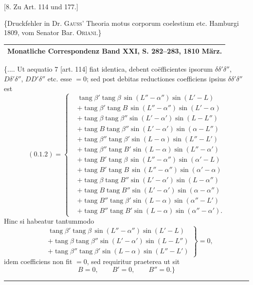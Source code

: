 \begin{center}
[8. Zu Art. 114 und 177.]
\end{center}
\begin{center}
\{Druckfehler in Dr. \textsc{Gauss}' Theoria motus corporum coelestium etc. Hamburgi 1809, vom Senator Bar. \textsc{Oriani}.\}
\end{center}
\begin{center}
\begin{tabular}{c}\hline
\small Monatliche Correspondenz Band XXI, S. 282--283, 1810 März.\\\hline
\end{tabular}
\end{center}
\{.... Ut aequatio 7 [art. 114] fiat identica, debent coëfficientes ipsorum \(\delta\delta'\delta''\), \(D\delta'\delta''\), \(DD'\delta''\) etc. esse \(=0\); sed post debitas reductiones coefficiens ipsius \(\delta\delta'\delta''\) est
\[
(0.1.2)=\left\{\begin{aligned}
&\operatorname{tang}\beta'\operatorname{tang}\beta\,\sin(L''-\alpha'')\sin(L'-L)\\
&+\operatorname{tang}\beta'\operatorname{tang}B\,\sin(L''-\alpha'')\sin(L'-\alpha)\\
&+\operatorname{tang}\beta\operatorname{tang}\beta''\sin(L'-\alpha')\sin(L-L'')\\
&+\operatorname{tang}B\operatorname{tang}\beta''\sin(L'-\alpha')\sin(\alpha-L'')\\
&+\operatorname{tang}\beta''\operatorname{tang}\beta'\sin(L-\alpha)\sin(L''-L')\\
&+\operatorname{tang}\beta''\operatorname{tang}B'\sin(L-\alpha)\sin(L''-\alpha')\\
&+\operatorname{tang}B'\operatorname{tang}\beta\,\sin(L''-\alpha'')\sin(\alpha'-L)\\
&+\operatorname{tang}B'\operatorname{tang}B\,\sin(L''-\alpha'')\sin(\alpha'-\alpha)\\
&+\operatorname{tang}\beta\operatorname{tang}B''\sin(L'-\alpha')\sin(L-\alpha'')\\
&+\operatorname{tang}B\operatorname{tang}B''\sin(L'-\alpha')\sin(\alpha-\alpha'')\\
&+\operatorname{tang}B''\operatorname{tang}\beta'\sin(L-\alpha)\sin(\alpha''-L')\\
&+\operatorname{tang}B''\operatorname{tang}B'\sin(L-\alpha)\sin(\alpha''-\alpha').
\end{aligned}\right.
\]
Hinc si habeatur tantummodo
\[
\left.\begin{aligned}
&\operatorname{tang}\beta'\operatorname{tang}\beta\,\sin(L''-\alpha'')\sin(L'-L)\\
&+\operatorname{tang}\beta\operatorname{tang}\beta''\sin(L'-\alpha')\sin(L-L'')\\
&+\operatorname{tang}\beta''\operatorname{tang}\beta'\sin(L-\alpha)\sin(L''-L')
\end{aligned}\right\}=0,
\]
idem coefficiens non fit \(=0\), sed requiritur praeterea ut sit
\[
B=0,\qquad B'=0,\qquad B''=0.\}
\]
\begin{center}\rule{.25\textwidth}{.35pt}\end{center}

